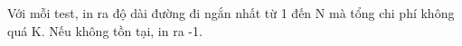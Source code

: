Với mỗi test, in ra độ dài đường đi ngắn nhất từ 1 đến N mà tổng chi phí không quá K. Nếu không tồn tại, in ra -1.  

\